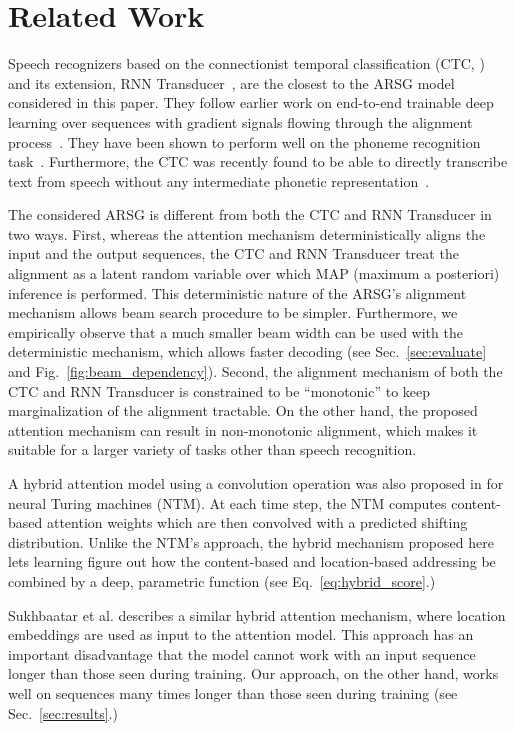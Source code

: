 \documentclass{article}
\begin{document}
\section{Related Work}

Speech recognizers based on the connectionist temporal classification (CTC,
\cite{graves_2006_connectionist}) and its extension, RNN
Transducer~\cite{graves_2012_sequence}, are the closest to the ARSG model
considered in this paper. They follow earlier work on end-to-end trainable deep
learning over sequences with gradient signals flowing through the alignment
process~\cite{LeCun98-small}. They have been shown to perform well on the
phoneme recognition task~\cite{graves_2013_timit}.  Furthermore, the CTC was
recently found to be able to directly transcribe text from speech without any
intermediate phonetic representation~\cite{graves_2014_towards}.

The considered ARSG is different from both the CTC and RNN Transducer in two
ways.  First, whereas the attention mechanism deterministically aligns the input
and the output sequences, the CTC and RNN Transducer treat the alignment as a
latent random variable over which MAP (maximum a posteriori) inference is
performed. This deterministic nature of the ARSG's alignment mechanism allows
beam search procedure to be simpler. Furthermore, we empirically observe that a
much smaller beam width can be used with the deterministic mechanism, which
allows faster decoding (see Sec.~\ref{sec:evaluate} and
Fig.~\ref{fig:beam_dependency}).
Second, the alignment mechanism of both the CTC and RNN Transducer is
constrained to be ``monotonic'' to keep marginalization of the alignment
tractable. On the other hand, the proposed attention mechanism can result in
non-monotonic alignment, which makes it suitable for a larger variety of tasks
other than speech recognition.

A hybrid attention model using a convolution operation was also proposed in
\cite{graves_2014} for neural Turing machines (NTM). At each time step, the NTM
computes content-based attention weights which are then convolved with a
predicted shifting distribution. Unlike the NTM's approach, the hybrid mechanism
proposed here lets learning figure out how the content-based and location-based
addressing be combined by a deep, parametric function (see
Eq.~\eqref{eq:hybrid_score}.) 


Sukhbaatar et al. \cite{sukhbaatar_2015} describes a similar hybrid attention
mechanism, where location embeddings are used as input to the attention model.
This approach has an important disadvantage that the model cannot work with an
input sequence longer than those seen during training. Our approach, on the
other hand, works well on sequences many times longer than those seen during
training (see Sec.~\ref{sec:results}.)
\end{document}

